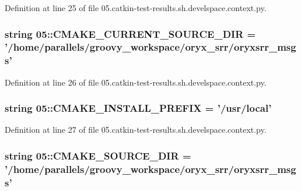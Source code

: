 \-Definition at line 25 of file 05.\-catkin-\/test-\/results.\-sh.\-develspace.\-context.\-py.

\subsubsection[{\-C\-M\-A\-K\-E\-\_\-\-C\-U\-R\-R\-E\-N\-T\-\_\-\-S\-O\-U\-R\-C\-E\-\_\-\-D\-I\-R}]{\setlength{\rightskip}{0pt plus 5cm}string 05\-::{\bf \-C\-M\-A\-K\-E\-\_\-\-C\-U\-R\-R\-E\-N\-T\-\_\-\-S\-O\-U\-R\-C\-E\-\_\-\-D\-I\-R} = '/home/parallels/groovy\-\_\-workspace/oryx\-\_\-srr/oryxsrr\-\_\-msgs'}\label{namespace05_ade586154cb60ea808020e5d853e5b800}


\-Definition at line 26 of file 05.\-catkin-\/test-\/results.\-sh.\-develspace.\-context.\-py.

\subsubsection[{\-C\-M\-A\-K\-E\-\_\-\-I\-N\-S\-T\-A\-L\-L\-\_\-\-P\-R\-E\-F\-I\-X}]{\setlength{\rightskip}{0pt plus 5cm}string 05\-::{\bf \-C\-M\-A\-K\-E\-\_\-\-I\-N\-S\-T\-A\-L\-L\-\_\-\-P\-R\-E\-F\-I\-X} = '/usr/local'}\label{namespace05_a826c62b13336f983ddb2f0e5e8844294}


\-Definition at line 27 of file 05.\-catkin-\/test-\/results.\-sh.\-develspace.\-context.\-py.

\subsubsection[{\-C\-M\-A\-K\-E\-\_\-\-S\-O\-U\-R\-C\-E\-\_\-\-D\-I\-R}]{\setlength{\rightskip}{0pt plus 5cm}string 05\-::{\bf \-C\-M\-A\-K\-E\-\_\-\-S\-O\-U\-R\-C\-E\-\_\-\-D\-I\-R} = '/home/parallels/groovy\-\_\-workspace/oryx\-\_\-srr/oryxsrr\-\_\-msgs'}\label{namespace05_a64a69e49f8bb64d03b726848381e589a}


